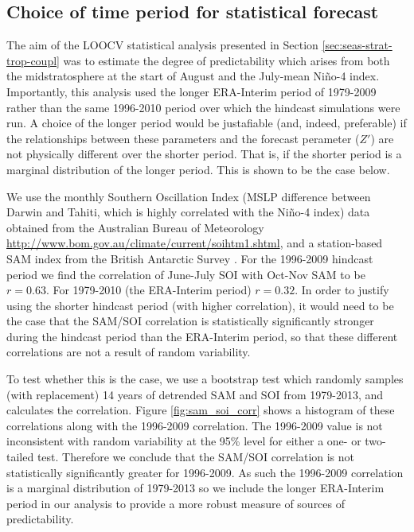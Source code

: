 \begin{subappendices}
\section{Choice of time period for statistical forecast}
\label{sec:app-choice-time-period}

The aim of the LOOCV statistical analysis presented in Section
\ref{sec:seas-strat-trop-coupl} was to estimate the degree of predictability
which arises from both the midstratosphere at the start of August and the
July-mean Ni\~no-4 index. Importantly, this analysis used the longer ERA-Interim
period of 1979-2009 rather than the same 1996-2010 period over which the
hindcast simulations were run. A choice of the longer period would be
justafiable (and, indeed, preferable) if the relationships between these
parameters and the forecast perameter ($Z'$) are not physically different over
the shorter period. That is, if the shorter period is a marginal distribution of
the longer period. This is shown to be the case below.

We use the monthly Southern Oscillation Index (MSLP difference between Darwin
and Tahiti, which is highly correlated with the Ni\~no-4 index) data obtained
from the Australian Bureau of Meteorology
\url{http://www.bom.gov.au/climate/current/soihtm1.shtml}, and a station-based
SAM index from the British Antarctic Survey \citep{Marshall2003}. For the
1996-2009 hindcast period we find the correlation of June-July SOI with Oct-Nov
SAM to be $r=0.63$. For 1979-2010 (the ERA-Interim period) $r=0.32$. In order to
justify using the shorter hindcast period (with higher correlation), it would
need to be the case that the SAM/SOI correlation is statistically significantly
stronger during the hindcast period than the ERA-Interim period, so that these
different correlations are not a result of random variability.

To test whether this is the case, we use a bootstrap test which randomly samples
(with replacement) 14 years of detrended SAM and SOI from 1979-2013, and
calculates the correlation. Figure \ref{fig:sam_soi_corr} shows a histogram of
these correlations along with the 1996-2009 correlation. The 1996-2009 value is
not inconsistent with random variability at the 95\% level for either a one- or
two-tailed test. Therefore we conclude that the SAM/SOI correlation is not
statistically significantly greater for 1996-2009. As such the 1996-2009
correlation is a marginal distribution of 1979-2013 so we include the longer
ERA-Interim period in our analysis to provide a more robust measure of sources
of predictability. 


\end{subappendices}
